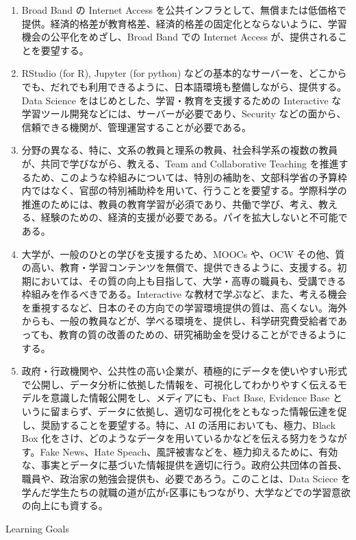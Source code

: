 \documentclass[
]{book}
\theoremstyle{definition}
\theoremstyle{definition}
\theoremstyle{definition}
\theoremstyle{definition}
\theoremstyle{remark}
\begin{document}
\begin{enumerate}
\def\labelenumi{\arabic{enumi}.}
\item
  Broad Band の Internet Access を公共インフラとして、無償または低価格で提供。経済的格差が教育格差、経済的格差の固定化とならないように、学習機会の公平化をめざし、Broad Band での Internet Access が、提供されることを要望する。
\item
  RStudio (for R), Jupyter (for python) などの基本的なサーバーを、どこからでも、だれでも利用できるように、日本語環境も整備しながら、提供する。Data Science をはじめとした、学習・教育を支援するための Interactive な学習ツール開発などには、サーバーが必要であり、Security などの面から、信頼できる機関が、管理運営することが必要である。
\item
  分野の異なる、特に、文系の教員と理系の教員、社会科学系の複数の教員が、共同で学びながら、教える、Team and Collaborative Teaching を推進するため、このような枠組みについては、特別の補助を、文部科学省の予算枠内ではなく、官邸の特別補助枠を用いて、行うことを要望する。学際科学の推進のためには、教員の教育学習が必須であり、共働で学び、考え、教える、経験のための、経済的支援が必要である。パイを拡大しないと不可能である。
\item
  大学が、一般のひとの学びを支援するため、MOOCs や、OCW その他、質の高い、教育・学習コンテンツを無償で、提供できるように、支援する。初期においては、その質の向上も目指して、大学・高専の職員も、受講できる枠組みを作るべきである。Interactive な教材で学ぶなど、また、考える機会を重視するなど、日本のその方向での学習環境提供の質は、高くない。海外からも、一般の教員などが、学べる環境を、提供し、科学研究費受給者であっても、教育の質の改善のための、研究補助金を受けることができるようにする。
\item
  政府・行政機関や、公共性の高い企業が、積極的にデータを使いやすい形式で公開し、データ分析に依拠した情報を、可視化してわかりやすく伝えるモデルを意識した情報公開をし、メディアにも、Fact Base, Evidence Base というに留まらず、データに依拠し、適切な可視化をともなった情報伝達を促し、奨励することを要望する。特に、AI の活用においても、極力、Black Box 化をさけ、どのようなデータを用いているかなどを伝える努力をうながす。Fake News、Hate Speach、風評被害などを、極力抑えるために、有効な、事実とデータに基づいた情報提供を適切に行う。政府公共団体の首長、職員や、政治家の勉強会提供も、必要であろう。このことは、Data Sciece を学んだ学生たちの就職の道が広がr区事にもつながり、大学などでの学習意欲の向上にも資する。
\end{enumerate}

Learning Goals
\end{document}
